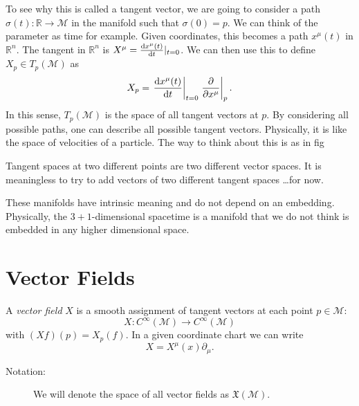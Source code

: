To see why this is called a tangent vector, we are going to consider a path $\sigma(t): \mathbb{R} \to \mathcal{M}$ in the manifold such that $\sigma(0) = p$. We can think of the parameter as time for example.
Given coordinates, this becomes a path $x^\mu(t)$ in $\mathbb{R}^n$. The tangent in $\mathbb{R}^n$ is $X^\mu = \dv{x^\mu(t)}{t}\rvert_{t=0}$. We can then use this to define $X_p \in T_p(\mathcal{M})$ as
\begin{equation}
  X_p = \left.\dv{x^\mu(t)}{t}\right\rvert_{t = 0 } \left.\pdv{}{x^\mu}\right\rvert_p.
\end{equation}
In this sense, $T_p(\mathcal{M})$ is the space of all tangent vectors at $p$.
By considering all possible paths, one can describe all possible tangent vectors. Physically, it is like the space of velocities of a particle.
The way to think about this is as in fig
\begin{leftbar}
  \begin{remark}
    Tangent spaces at two different points are two different vector spaces. It is meaningless to try to add vectors of two different tangent spaces \ldots for now.
  \end{remark}
\end{leftbar}
\begin{leftbar}
  \begin{remark}
    These manifolds have intrinsic meaning and do not depend on an embedding. Physically, the $3+1$-dimensional spacetime is a manifold that we do not think is embedded in any higher dimensional space.
  \end{remark}
\end{leftbar}

\section{Vector Fields}%
\label{sec:vector_fields}

\begin{definition}
  A \emph{vector field} $X$ is a smooth assignment of tangent vectors at each point $p \in \mathcal{M}$:
  \begin{equation}
    X: C^\infty(\mathcal{M}) \to C^\infty(\mathcal{M})
  \end{equation}
  with $(Xf)(p) = X_p (f)$. In a given coordinate chart we can write
  \begin{equation}
    X = X^\mu (x) \partial_\mu.
  \end{equation} 
\end{definition}
\begin{description}
  \item[Notation:] We will denote the space of all vector fields as $\mathfrak{X} (\mathcal{M})$.
\end{description}

